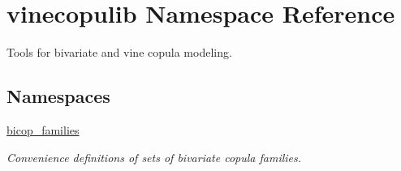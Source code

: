 \hypertarget{namespacevinecopulib}{}\section{vinecopulib Namespace Reference}
\label{namespacevinecopulib}


Tools for bivariate and vine copula modeling.  


\subsection*{Namespaces}
\begin{DoxyCompactItemize}
\item 
 \hyperlink{namespacevinecopulib_1_1bicop__families}{bicop\+\_\+families}
\begin{DoxyCompactList}\small\item\em Convenience definitions of sets of bivariate copula families. \end{DoxyCompactList}\end{DoxyCompactItemize}
